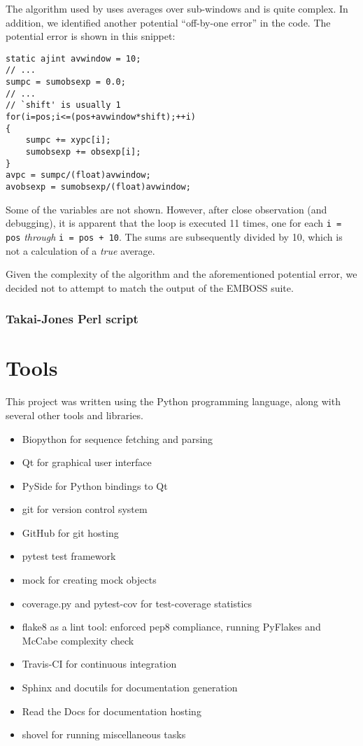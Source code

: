 \documentclass{bioinfo}
\begin{document}
The algorithm used by  uses averages over
sub-windows and is quite complex. In addition, we identified another
potential ``off-by-one error'' in the code. The potential error is
shown in this snippet:

\begin{verbatim}
static ajint avwindow = 10;
// ...
sumpc = sumobsexp = 0.0;
// ...
// `shift' is usually 1
for(i=pos;i<=(pos+avwindow*shift);++i)
{
    sumpc += xypc[i];
    sumobsexp += obsexp[i];
}
avpc = sumpc/(float)avwindow;
avobsexp = sumobsexp/(float)avwindow;
\end{verbatim}

Some of the variables are not shown. However, after close observation
(and debugging), it is apparent that the loop is executed 11 times,
one for each \verb|i = pos| \emph{through} \verb|i = pos + 10|. The
sums are subsequently divided by 10, which is not a calculation of a
\emph{true} average.

Given the complexity of the algorithm and the aforementioned potential
error, we decided not to attempt to match the output of the EMBOSS
suite.

\subsubsection{Takai-Jones Perl script}

\section{Tools}

This project was written using the Python programming language, along with several other tools and libraries.

\begin{itemize}
\item Biopython for sequence fetching and parsing
\item Qt for graphical user interface
\item PySide for Python bindings to Qt
\item git for version control system
\item GitHub for git hosting
\item pytest test framework
\item mock for creating mock objects
\item coverage.py and pytest-cov for test-coverage statistics
\item flake8 as a lint tool: enforced pep8 compliance, running PyFlakes and McCabe complexity check
\item Travis-CI for continuous integration
\item Sphinx and docutils for documentation generation
\item Read the Docs for documentation hosting
\item shovel for running miscellaneous tasks
\end{itemize}
\end{document}
